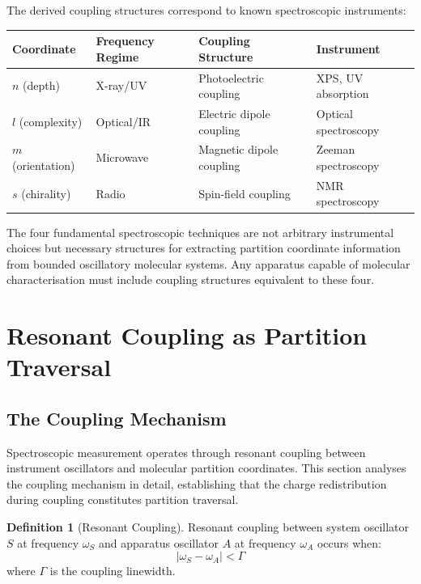 \documentclass[twocolumn,10pt,a4paper]{article}
\theoremstyle{definition}
\newtheorem{definition}[theorem]{Definition}
\theoremstyle{remark}
\begin{document}
The derived coupling structures correspond to known spectroscopic instruments:

\begin{center}
\begin{tabular}{llll}
\toprule
\textbf{Coordinate} & \textbf{Frequency Regime} & \textbf{Coupling Structure} & \textbf{Instrument} \\
\midrule
$n$ (depth) & X-ray/UV & Photoelectric coupling & XPS, UV absorption \\
$l$ (complexity) & Optical/IR & Electric dipole coupling & Optical spectroscopy \\
$m$ (orientation) & Microwave & Magnetic dipole coupling & Zeeman spectroscopy \\
$s$ (chirality) & Radio & Spin-field coupling & NMR spectroscopy \\
\bottomrule
\end{tabular}
\end{center}

The four fundamental spectroscopic techniques are not arbitrary instrumental choices but necessary structures for extracting partition coordinate information from bounded oscillatory molecular systems. Any apparatus capable of molecular characterisation must include coupling structures equivalent to these four.

\section{Resonant Coupling as Partition Traversal}
\label{sec:coupling}

\subsection{The Coupling Mechanism}

Spectroscopic measurement operates through resonant coupling between instrument oscillators and molecular partition coordinates. This section analyses the coupling mechanism in detail, establishing that the charge redistribution during coupling constitutes partition traversal.

\begin{definition}[Resonant Coupling]
\label{def:resonant_coupling}
Resonant coupling between system oscillator $S$ at frequency $\omega_S$ and apparatus oscillator $A$ at frequency $\omega_A$ occurs when:
\begin{equation}
|\omega_S - \omega_A| < \Gamma
\end{equation}
where $\Gamma$ is the coupling linewidth.
\end{definition}
\end{document}
